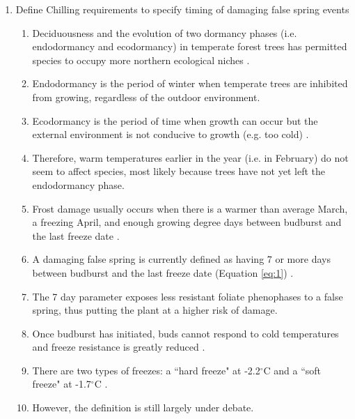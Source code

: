 \documentclass{article}\usepackage[]{graphicx}\usepackage[]{color}
\begin{document}
\begin{enumerate}
\item Define Chilling requirements to specify timing of damaging false spring events
\begin {enumerate}
\item Deciduousness and the evolution of two dormancy phases (i.e. endodormancy and ecodormancy) in temperate forest trees has permitted species to occupy more northern ecological niches \citep{Samish1954}.
\item Endodormancy is the period of winter when temperate trees are inhibited from growing, regardless of the outdoor environment.
\item Ecodormancy is the period of time when growth can occur but the external environment is not conducive to growth (e.g. too cold) \citep{Basler2012}.
\item Therefore, warm temperatures earlier in the year (i.e. in February) do not seem to affect species, most likely because trees have not yet left the endodormancy phase.
\item Frost damage usually occurs when there is a warmer than average March, a freezing April, and enough growing degree days between budburst and the last freeze date \citep{Augspurger2013}.
\item A damaging false spring is currently defined as having 7 or more days between budburst and the last freeze date (Equation \ref{eq:1}) \citep{Peterson2014}.
\item The 7 day parameter exposes less resistant foliate phenophases to a false spring, thus putting the plant at a higher risk of damage. 
\item Once budburst has initiated, buds cannot respond to cold temperatures and freeze resistance is greatly reduced \citep{Taschler2004, Lenz2013, Vitasse2014}.
\item There are two types of freezes: a ``hard freeze" at -2.2$^{\circ}$C and a ``soft freeze" at -1.7$^{\circ}$C \citep{Vavrus2006, Kodra2011, Augspurger2013}.
\item However, the definition is still largely under debate. 
\end{enumerate}


\end{enumerate}
\end{document}
